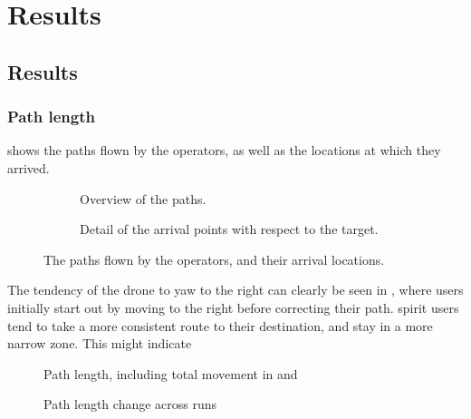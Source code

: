 \chapter{Results}
\label{ch:results}
\section{Results}
  \subsection{Path length}
   shows the paths flown by the operators, as well as the locations at which they arrived.

  \begin{figure}[h]
    \centering
    \begin{subfigure}[b]{0.45\textwidth}
      \ifdraft{}{}
      \label{fig:paths_overview}
      \caption{Overview of the paths.}
    \end{subfigure}
    \hfill
    \begin{subfigure}[b]{0.45\textwidth}
      \ifdraft{}{}
      \label{fig:paths_detailed}
      \caption{Detail of the arrival points with respect to the target.}
    \end{subfigure}
    \label{fig:paths}
    \caption[Paths and arrivals]{The paths flown by the operators, and their arrival locations.}
  \end{figure}

  The tendency of the drone to yaw to the right can clearly be seen in , where users initially start out by moving to the right before correcting their path.
  \gls{spirit} users tend to take a more consistent route to their destination, and stay in a more narrow zone.
  This might indicate 
  \begin{figure}[h]
    \centering
    \ifdraft{}{}
    \label{fig:movement}
    \caption{Path length, including total movement in  and }
  \end{figure}

  \begin{figure}[h]
    \centering
    \ifdraft{}{}
    \label{fig:movement_runs}
    \caption{Path length change across runs}
  \end{figure}

